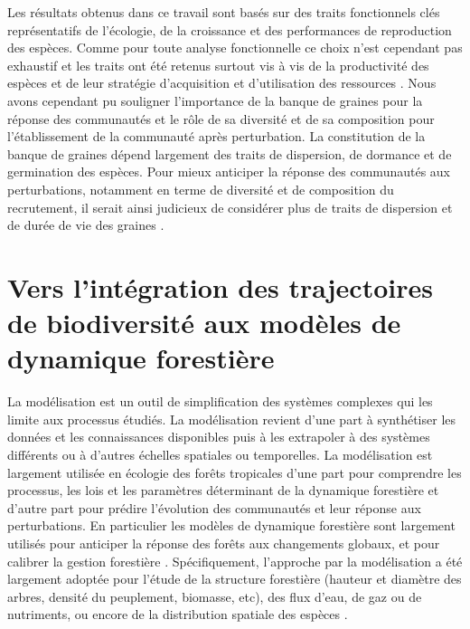 \documentclass[
  11pt,
  french,
  A4paper,
  extrafontsizes,onecolumn,openright
  ]{memoir}
\begin{document}
Les résultats obtenus dans ce travail sont basés sur des traits
fonctionnels clés représentatifs de l'écologie, de la croissance et des
performances de reproduction des espèces. Comme pour toute analyse
fonctionnelle ce choix n'est cependant pas exhaustif et les traits ont
été retenus surtout vis à vis de la productivité des espèces et de leur
stratégie d'acquisition et d'utilisation des ressources
\autocites{Reich2014}{Kunstler2016}. Nous avons cependant pu souligner
l'importance de la banque de graines pour la réponse des communautés et
le rôle de sa diversité et de sa composition pour l'établissement de la
communauté après perturbation. La constitution de la banque de graines
dépend largement des traits de dispersion, de dormance et de germination
des espèces. Pour mieux anticiper la réponse des communautés aux
perturbations, notamment en terme de diversité et de composition du
recrutement, il serait ainsi judicieux de considérer plus de traits de
dispersion et de durée de vie des graines
\autocites{Verdu2005}{Schleuning2016}{Yguel_inprep}.

\section{Vers l'intégration des trajectoires de biodiversité aux modèles
de dynamique
forestière}\label{vers-lintegration-des-trajectoires-de-biodiversite-aux-modeles-de-dynamique-forestiere}

La modélisation est un outil de simplification des systèmes complexes
qui les limite aux processus étudiés. La modélisation revient d'une part
à synthétiser les données et les connaissances disponibles puis à les
extrapoler à des systèmes différents ou à d'autres échelles spatiales ou
temporelles. La modélisation est largement utilisée en écologie des
forêts tropicales d'une part pour comprendre les processus, les lois et
les paramètres déterminant de la dynamique forestière et d'autre part
pour prédire l'évolution des communautés et leur réponse aux
perturbations. En particulier les modèles de dynamique forestière sont
largement utilisés pour anticiper la réponse des forêts aux changements
globaux, et pour calibrer la gestion forestière
\autocite{Gourlet-Fleury2005}. Spécifiquement, l'approche par la
modélisation a été largement adoptée pour l'étude de la structure
forestière (hauteur et diamètre des arbres, densité du peuplement,
biomasse, etc), des flux d'eau, de gaz ou de nutriments, ou encore de la
distribution spatiale des espèces
\autocites{Piponiot2016}{Rutishauser2016}{Grimm2017}.
\end{document}
